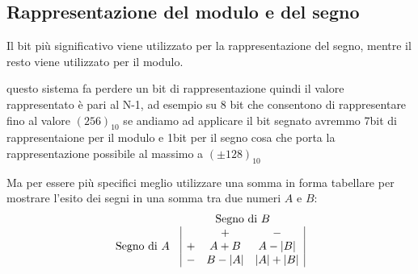 \subsection{Rappresentazione del modulo e del segno}
\label{sec:modesegnoinbin}
Il bit più significativo viene utilizzato per la rappresentazione del segno, mentre
il resto viene utilizzato per il modulo.
\begin{nota}
  questo sistema fa perdere un bit di rappresentazione quindi il valore rappresentato è
  pari al N-1, ad esempio su 8 bit che consentono di rappresentare fino al
  valore $(256)_{10}$ se andiamo ad applicare il bit segnato avremmo 7bit di
  rappresentaione per il modulo e 1bit per il segno cosa che porta la rappresentazione
  possibile al massimo a $(\pm 128)_{10}$
\end{nota}
Ma per essere più specifici meglio utilizzare una somma in forma tabellare per mostrare
l'esito dei segni in una somma tra due numeri $A$ e $B$:
\begin{equation}
  \label{eq:sommabin1}
  \begin{matrix}
    & \text{Segno di } B\\
    \text{Segno di } A &
                       \begin{array}{|ccc|}
                         &+&-\\
                         +& A+B & A-\lvert B\rvert\\
                         - & B-\lvert A\rvert & \lvert A\rvert+\lvert B\rvert
                       \end{array}
  \end{matrix}
\end{equation}

